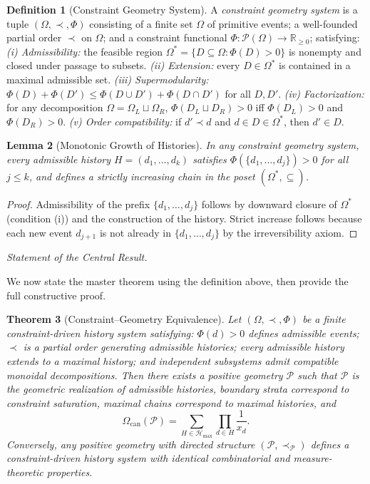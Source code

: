 \documentclass[11pt]{article}
\theoremstyle{plain}
\newtheorem{theorem}{Theorem}[section]
\newtheorem{lemma}[theorem]{Lemma}
\theoremstyle{definition}
\newtheorem{definition}[theorem]{Definition}
\theoremstyle{remark}
\newcommand{\R}{\mathbb{R}}
\newcommand{\Phif}{\Phi}
\newcommand{\OmKS}{\Omega}
\newcommand{\CF}{\Omega_{\mathrm{can}}}
\newcommand{\Hmax}{\mathcal{H}_{\max}}
\begin{document}
\begin{definition}[Constraint Geometry System]
\label{def:CGS}
A \emph{constraint geometry system} is a tuple $(\OmKS, \prec, \Phif)$ consisting of a finite set $\OmKS$ of primitive events; a well-founded partial order $\prec$ on $\OmKS$; and a constraint functional $\Phif: \mathcal{P}(\OmKS) \to \R_{\geq 0}$; satisfying:
\emph{(i) Admissibility:} the feasible region $\OmKS^* = \{D \subseteq \OmKS : \Phif(D) > 0\}$ is nonempty and closed under passage to subsets.
\emph{(ii) Extension:} every $D \in \OmKS^*$ is contained in a maximal admissible set.
\emph{(iii) Supermodularity:} $\Phif(D) + \Phif(D') \leq \Phif(D \cup D') + \Phif(D \cap D')$ for all $D, D'$.
\emph{(iv) Factorization:} for any decomposition $\OmKS = \OmKS_L \sqcup \OmKS_R$, $\Phif(D_L \sqcup D_R) > 0$ iff $\Phif(D_L) > 0$ and $\Phif(D_R) > 0$.
\emph{(v) Order compatibility:} if $d' \prec d$ and $d \in D \in \OmKS^*$, then $d' \in D$.
\end{definition}

\begin{lemma}[Monotonic Growth of Histories]
In any constraint geometry system, every admissible history $H = (d_1, \ldots, d_k)$ satisfies $\Phif(\{d_1, \ldots, d_j\}) > 0$ for all $j \leq k$, and defines a strictly increasing chain in the poset $(\OmKS^*, \subseteq)$.
\end{lemma}

\begin{proof}
Admissibility of the prefix $\{d_1, \ldots, d_j\}$ follows by downward closure of $\OmKS^*$ (condition (i)) and the construction of the history. Strict increase follows because each new event $d_{j+1}$ is not already in $\{d_1, \ldots, d_j\}$ by the irreversibility axiom.
\end{proof}

\medskip\noindent\textit{Statement of the Central Result.}

We now state the master theorem using the definition above, then provide the full constructive proof.

\begin{theorem}[Constraint--Geometry Equivalence]
\label{thm:master}
Let $(\OmKS, \prec, \Phif)$ be a finite constraint-driven history system satisfying: $\Phif(d) > 0$ defines admissible events; $\prec$ is a partial order generating admissible histories; every admissible history extends to a maximal history; and independent subsystems admit compatible monoidal decompositions. Then there exists a positive geometry $\mathcal{P}$ such that $\mathcal{P}$ is the geometric realization of admissible histories, boundary strata correspond to constraint saturation, maximal chains correspond to maximal histories, and
\[
  \CF(\mathcal{P}) = \sum_{H \in \Hmax} \prod_{d \in H} \frac{1}{x_d}.
\]
Conversely, any positive geometry with directed structure $(\mathcal{P}, \prec_{\mathcal{P}})$ defines a constraint-driven history system with identical combinatorial and measure-theoretic properties.
\end{theorem}
\end{document}

